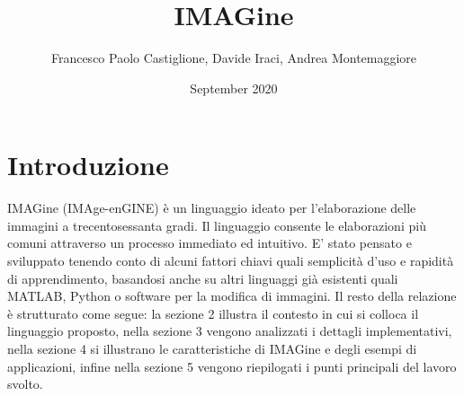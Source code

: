 \documentclass[10pt]{article}
\title{IMAGine}
\author{Francesco Paolo Castiglione, Davide Iraci, Andrea Montemaggiore}
\date{September 2020}
\begin{document}
	\maketitle
	\tableofcontents
	\newpage

\section{Introduzione}IMAGine (IMAge-enGINE) è un linguaggio ideato per l’elaborazione delle immagini a trecentosessanta gradi. Il linguaggio consente le elaborazioni più comuni attraverso un processo immediato ed intuitivo.
E’ stato pensato e sviluppato tenendo conto di alcuni fattori chiavi quali semplicità d’uso e rapidità di apprendimento, basandosi anche su altri linguaggi già esistenti quali MATLAB, Python o software per la modifica di immagini.\newline
Il resto della relazione è strutturato come segue: la sezione 2 illustra il contesto in cui si colloca il linguaggio proposto, nella sezione 3 vengono analizzati i dettagli implementativi, nella sezione 4 si illustrano le caratteristiche di IMAGine e degli esempi di applicazioni, infine nella sezione 5 vengono riepilogati i punti principali del lavoro svolto.\newpage
\end{document}
